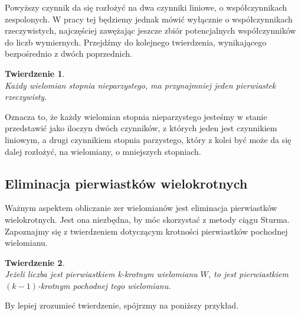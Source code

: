\documentclass[oneside,a4paper]{book}
\newtheorem{theorem}{Twierdzenie}
\begin{document}
	Powyższy czynnik da się rozłożyć na dwa czynniki liniowe, o współczynnikach zespolonych. W pracy tej będziemy jednak mówić wyłącznie o współczynnikach rzeczywistych, najczęściej zawężając jeszcze zbiór potencjalnych współczynników do liczb wymiernych. Przejdźmy do kolejnego twierdzenia, wynikającego bezpośrednio z dwóch poprzednich.
	
	\begin{theorem}
		$ $\\
		Każdy wielomian stopnia nieparzystego, ma przynajmniej jeden pierwiastek rzeczywisty.
	\end{theorem}
	
	Oznacza to, że każdy wielomian stopnia nieparzystego jesteśmy w stanie przedstawić jako iloczyn dwóch czynników, z których jeden jest czynnikiem liniowym, a drugi czynnikiem stopnia parzystego, który z kolei być może da się dalej rozłożyć, na wielomiany, o mniejszych stopniach.
	
	\subsection{Eliminacja pierwiastków wielokrotnych}
	
	Ważnym aspektem obliczanie zer wielomianów jest eliminacja pierwiastków wielokrotnych. Jest ona niezbędna, by móc skorzystać z metody ciągu Sturma. Zapoznajmy się z twierdzeniem dotyczącym krotności pierwiastków pochodnej wielomianu.
	
	\begin{theorem}
		$ $\\
		Jeżeli liczba jest pierwiastkiem k-krotnym wielomianu $W$, to jest pierwiastkiem $(k-1)$-krotnym pochodnej tego wielomianu.
	\end{theorem}
	
	By lepiej zrozumieć twierdzenie, spójrzmy na poniższy przykład.
	
\end{document}
